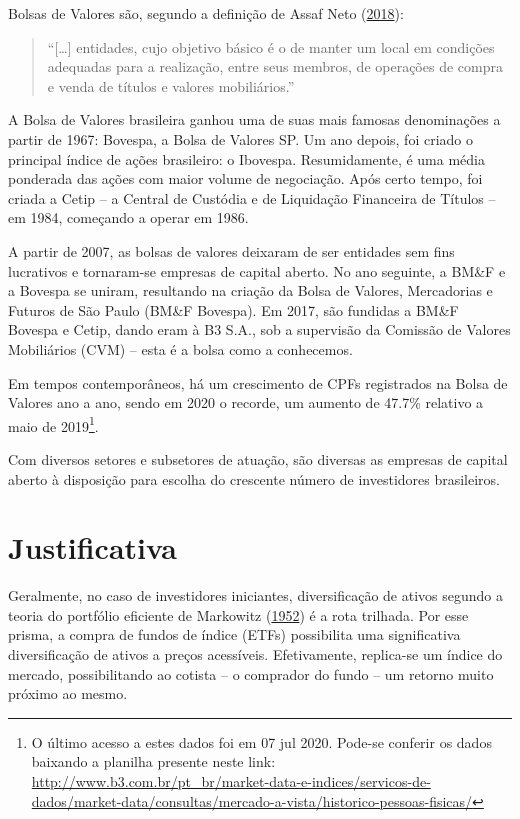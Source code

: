 \documentclass[grad,numbers]{coppe}
\begin{document}
  Bolsas de Valores são, segundo a definição de Assaf Neto (\protect\hyperlink{ref-assafneto2018}{2018}):
  \begin{quote}
  ``{[}\ldots{]} entidades, cujo objetivo básico é o de manter um local em condições adequadas para a realização, entre seus membros, de operações de compra e venda de títulos e valores mobiliários.''
  \end{quote}
  A Bolsa de Valores brasileira ganhou uma de suas mais famosas denominações a partir de 1967: Bovespa, a Bolsa de Valores SP. Um ano depois, foi criado o principal índice de ações brasileiro: o Ibovespa. Resumidamente, é uma média ponderada das ações com maior volume de negociação. Após certo tempo, foi criada a Cetip -- a Central de Custódia e de Liquidação Financeira de Títulos -- em 1984, começando a operar em 1986.
  
  A partir de 2007, as bolsas de valores deixaram de ser entidades sem fins lucrativos e tornaram-se empresas de capital aberto. No ano seguinte, a BM\&F e a Bovespa se uniram, resultando na criação da Bolsa de Valores, Mercadorias e Futuros de São Paulo (BM\&F Bovespa). Em 2017, são fundidas a BM\&F Bovespa e Cetip, dando eram à B3 S.A., sob a supervisão da Comissão de Valores Mobiliários (CVM) -- esta é a bolsa como a conhecemos.
  
  Em tempos contemporâneos, há um crescimento de CPFs registrados na Bolsa de Valores ano a ano, sendo em 2020 o recorde, um aumento de 47.7\% relativo a maio de 2019\footnote{O último acesso a estes dados foi em 07 jul 2020. Pode-se conferir os dados baixando a planilha presente neste link: \url{http://www.b3.com.br/pt_br/market-data-e-indices/servicos-de-dados/market-data/consultas/mercado-a-vista/historico-pessoas-fisicas/}}.
  
  Com diversos setores e subsetores de atuação, são diversas as empresas de capital aberto à disposição para escolha do crescente número de investidores brasileiros.
  
  \hypertarget{justificativa}{%
  \section{Justificativa}\label{justificativa}}
  
  Geralmente, no caso de investidores iniciantes, diversificação de ativos segundo a teoria do portfólio eficiente de Markowitz (\protect\hyperlink{ref-markowitz1952}{1952}) é a rota trilhada. Por esse prisma, a compra de fundos de índice (ETFs) possibilita uma significativa diversificação de ativos a preços acessíveis. Efetivamente, replica-se um índice do mercado, possibilitando ao cotista -- o comprador do fundo -- um retorno muito próximo ao mesmo.
  
\end{document}
